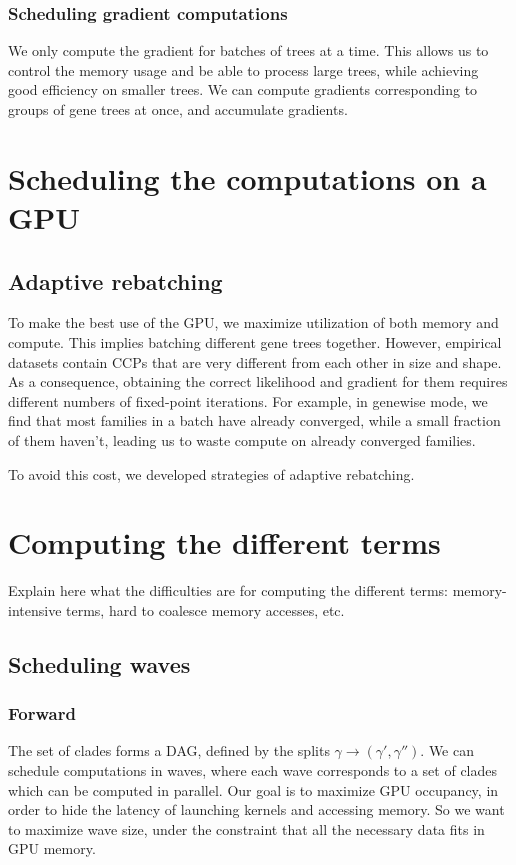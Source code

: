 \documentclass{article}
\newcommand{\1}{\mathbf{1}}
\begin{document}
\subsubsection{Scheduling gradient computations}
We only compute the gradient for batches of trees at a time. This allows us to control the memory usage and be able to process large trees, while achieving good efficiency on smaller trees.
We can compute gradients corresponding to groups of gene trees at once, and accumulate gradients. 
\section{Scheduling the computations on a GPU}
\subsection{Adaptive rebatching}
To make the best use of the GPU, we maximize utilization of both memory and compute. This implies batching different gene trees together. However, empirical datasets contain CCPs that are very different from each other in size and shape. As a consequence, obtaining the correct likelihood and gradient for them requires different numbers of fixed-point iterations. For example, in genewise mode, we find that most families in a batch have already converged, while a small fraction of them haven't, leading us to waste compute on already converged families.

To avoid this cost, we developed strategies of adaptive rebatching.
\section{Computing the different terms}
Explain here what the difficulties are for computing the different terms: memory-intensive terms, hard to coalesce memory accesses, etc.
\subsection{Scheduling waves}
\subsubsection{Forward}
The set of clades forms a DAG, defined by the splits $\gamma \to (\gamma',\gamma'')$. We can schedule computations in waves, where each wave corresponds to a set of clades which can be computed in parallel. Our goal is to maximize GPU occupancy, in order to hide the latency of launching kernels and accessing memory. So we want to maximize wave size, under the constraint that all the necessary data fits in GPU memory.
\end{document}
